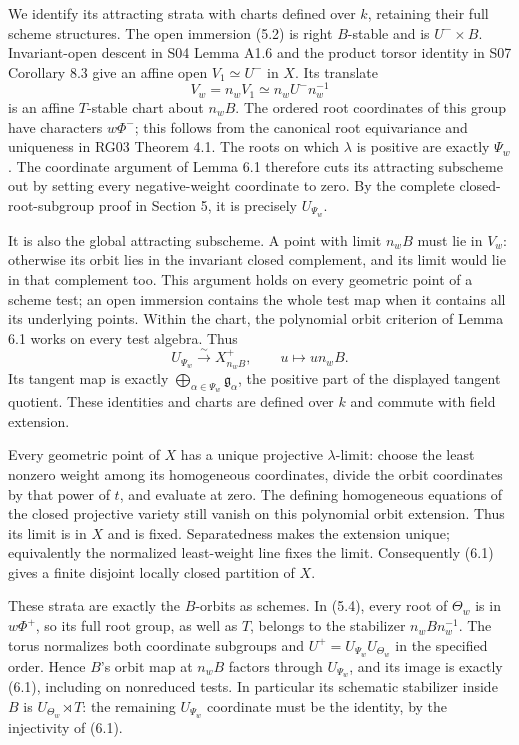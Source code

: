 \documentclass[11pt,a4paper,openany]{report}
\begin{document}
We identify its attracting strata with charts defined over \(k\), retaining their full scheme structures. The open immersion (5.2) is right \(B\)-stable and is \(U^-\times B\). Invariant-open descent in S04 Lemma A1.6 and the product torsor identity in S07 Corollary 8.3 give an affine open \(V_1\simeq U^-\) in \(X\). Its translate \[
          V_w=n_wV_1\simeq n_wU^-n_w^{-1}
\] is an affine \(T\)-stable chart about \(n_wB\). The ordered root coordinates of this group have characters \(w\Phi^-\); this follows from the canonical root equivariance and uniqueness in RG03 Theorem 4.1. The roots on which \(\lambda\) is positive are exactly \(\Psi_w\). The coordinate argument of Lemma 6.1 therefore cuts its attracting subscheme out by setting every negative-weight coordinate to zero. By the complete closed-root-subgroup proof in Section 5, it is precisely \(U_{\Psi_w}\).

It is also the global attracting subscheme. A point with limit \(n_wB\) must lie in \(V_w\): otherwise its orbit lies in the invariant closed complement, and its limit would lie in that complement too. This argument holds on every geometric point of a scheme test; an open immersion contains the whole test map when it contains all its underlying points. Within the chart, the polynomial orbit criterion of Lemma 6.1 works on every test algebra. Thus \[
              U_{\Psi_w}\xrightarrow{\sim}X_{n_wB}^+,
                    \qquad u\longmapsto un_wB.
\tag{6.1}
\] Its tangent map is exactly \(\bigoplus_{\alpha\in\Psi_w}\mathfrak g_\alpha\), the positive part of the displayed tangent quotient. These identities and charts are defined over \(k\) and commute with field extension.

Every geometric point of \(X\) has a unique projective \(\lambda\)-limit: choose the least nonzero weight among its homogeneous coordinates, divide the orbit coordinates by that power of \(t\), and evaluate at zero. The defining homogeneous equations of the closed projective variety still vanish on this polynomial orbit extension. Thus its limit is in \(X\) and is fixed. Separatedness makes the extension unique; equivalently the normalized least-weight line fixes the limit. Consequently (6.1) gives a finite disjoint locally closed partition of \(X\).

These strata are exactly the \(B\)-orbits as schemes. In (5.4), every root of \(\Theta_w\) is in \(w\Phi^+\), so its full root group, as well as \(T\), belongs to the stabilizer \(n_wBn_w^{-1}\). The torus normalizes both coordinate subgroups and \(U^+=U_{\Psi_w}U_{\Theta_w}\) in the specified order. Hence \(B\)'s orbit map at \(n_wB\) factors through \(U_{\Psi_w}\), and its image is exactly (6.1), including on nonreduced tests. In particular its schematic stabilizer inside \(B\) is \(U_{\Theta_w}\rtimes T\): the remaining \(U_{\Psi_w}\) coordinate must be the identity, by the injectivity of (6.1).
\end{document}
